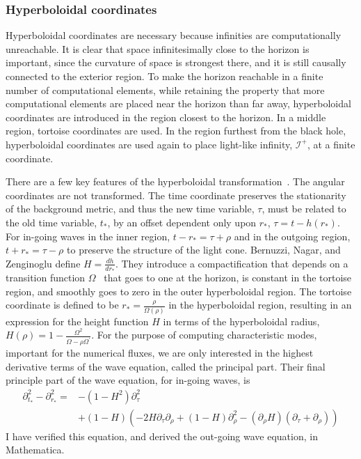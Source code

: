\subsubsection{Hyperboloidal coordinates}  
Hyperboloidal coordinates are necessary because infinities are computationally unreachable. It is clear that space infinitesimally close to the horizon is important, since the curvature of space is strongest there, and it is still causally connected to the exterior region. To make the horizon reachable in a finite number of computational elements, while retaining the property that more computational elements are placed near the horizon than far away, hyperboloidal coordinates are introduced in the region closest to the horizon. In a middle region, tortoise coordinates are used. In the region furthest from the black hole, hyperboloidal coordinates are used again to place light-like infinity, $\mathcal{I}^+$, at a finite coordinate. 



There are a few key features of the hyperboloidal transformation~\cite{bernuzzi_nagar_zenginoglu_hyperb}. The angular coordinates are not transformed. The time coordinate preserves the stationarity of the background metric, and thus the new time variable, $\tau$, must be related to the old time variable, $t_*$, by an offset dependent only upon $r_*$, $\tau=t-h(r_*)$. For in-going waves in the inner region, $t-r_*=\tau+\rho$ and in the outgoing region, $t+r_*=\tau-\rho$ to preserve the structure of the light cone. Bernuzzi, Nagar, and Zenginoglu define $H=\frac{dh}{dr_*}$. They introduce a compactification that depends on a transition function $\Omega$~\cite{OmegaTransferFunction} that goes to one at the horizon, is constant in the tortoise region, and smoothly goes to zero in the outer hyperboloidal region. The tortoise coordinate is defined to be  $r_*=\frac{\rho}{\Omega(\rho)}$ in the hyperboloidal region, resulting in an expression for the height function $H$ in terms of the hyperboloidal radius,  $H(\rho)=1-\frac{\Omega^2}{\Omega-\rho\Omega^\prime}$. For the purpose of computing characteristic modes, important for the numerical fluxes, we are only interested in the highest derivative terms of the wave equation, called the principal part. Their final principle part of the wave equation, for in-going waves, is~\cite{bernuzzi_nagar_zenginoglu_hyperb}
  \begin{eqnarray}
    \partial_{t_*}^2-\partial_{r_*}^2=&-(1-H^2)\partial_\tau^2\nonumber\\
    &+(1-H)(-2H\partial_\tau\partial_\rho+(1-H)\partial_\rho^2-(\partial_\rho H)(\partial_\tau+\partial_\rho))
  \end{eqnarray}    
I have verified this equation, and derived the out-going wave equation, in Mathematica.

